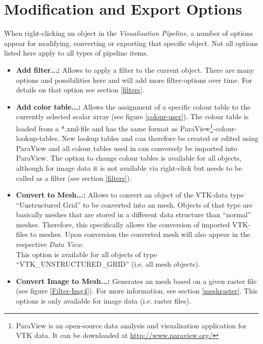 \section{Modification and Export Options}
\label{specvisoptions}

When right-clicking an object in the \emph{Visualisation Pipeline}, a number of options appear for modifying, converting or exporting that specific object. Not all options listed here apply to all types of pipeline items.

\begin{itemize}
\item \textbf{Add filter...:} Allows to apply a filter to the current object. There are many options and possibilities here and \ogs will add more filter-options over time. For details on that option see section \ref{filters}.
\item \textbf{Add color table...:} Allows the assignment of a specific colour table to the currently selected scalar array (see figure \ref{colour-user}). The colour table is loaded from a *.xml-file and has the same format as ParaView\footnote{ParaView is an open-source data analysis and visualisation application for VTK data. It can be downloaded at \url{http://www.paraview.org/}}-colour-lookup-tables.
    New lookup tables and can therefore be created or edited using ParaView and all colour tables used in \ogs can conversely be imported into ParaView.
    The option to change colour tables is available for all objects, although for image data it is not available via right-click but needs to be called as a filter (see section \ref{filters}).
\item \textbf{Convert to Mesh...:} Allows to convert an object of the VTK-data type ``Unstructured Grid'' to be converted into an \ogs mesh. Objects of that type are basically meshes that are stored in a different data structure than ``normal'' \ogs meshes. Therefore, this specifically allows the conversion of imported VTK-files to \ogs meshes. Upon conversion the converted mesh will also appear in the respective \emph{Data View.}\\
    This option is available for all objects of type ``VTK\_UN\-STRUCT\-URED\_GRID'' (i.e. all mesh objects).
\item \textbf{Convert Image to Mesh...:} Generates an \ogs mesh based on a given raster file (see figure \ref{Filter-Img4}). For more information, see section \ref{meshraster}. This options is only available for image data (i.e. raster files).

\end{itemize}
